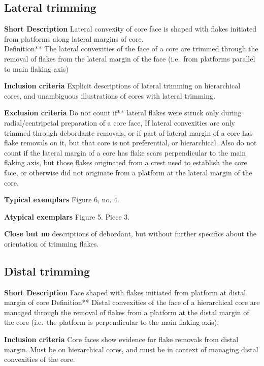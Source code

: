 \documentclass[
]{article}
\begin{document}
\hypertarget{lateral-trimming}{%
\subsection{Lateral trimming}\label{lateral-trimming}}

\textbf{Short Description} Lateral convexity of core face is shaped with
flakes initiated from platforms along lateral margins of core.\\
Definition** The lateral convexities of the face of a core are trimmed
through the removal of flakes from the lateral margin of the face
(i.e.~from platforms parallel to main flaking axis)

\textbf{Inclusion criteria} Explicit descriptions of lateral trimming on
hierarchical cores, and unambiguous illustrations of cores with lateral
trimming.

\textbf{Exclusion criteria} Do not count if** lateral flakes were struck
only during radial/centripetal preparation of a core face, If lateral
convexities are only trimmed through debordante removals, or if part of
lateral margin of a core has flake removals on it, but that core is not
preferential, or hierarchical. Also do not count if the lateral margin
of a core has flake scars perpendicular to the main flaking axis, but
those flakes originated from a crest used to establish the core face, or
otherwise did not originate from a platform at the lateral margin of the
core.

\textbf{Typical exemplars} Figure 6, no. 4.

\textbf{Atypical exemplars} Figure 5. Piece 3.

\textbf{Close but no} descriptions of debordant, but without further
specifics about the orientation of trimming flakes.

\hypertarget{distal-trimming}{%
\subsection{Distal trimming}\label{distal-trimming}}

\textbf{Short Description} Face shaped with flakes initiated from
platform at distal margin of core Definition** Distal convexities of the
face of a hierarchical core are managed through the removal of flakes
from a platform at the distal margin of the core (i.e.~the platform is
perpendicular to the main flaking axis).

\textbf{Inclusion criteria} Core faces show evidence for flake removals
from distal margin. Must be on hierarchical cores, and must be in
context of managing distal convexities of the core.
\end{document}
